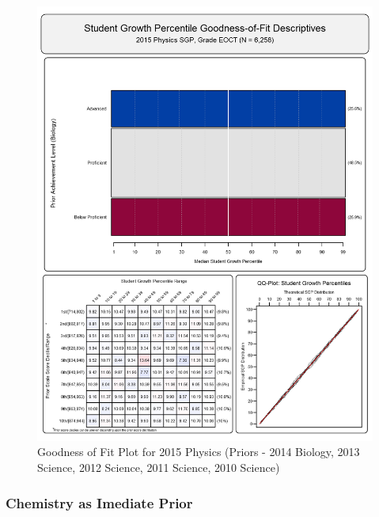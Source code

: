\documentclass[12pt]{article}
\begin{document}
\begin{figure}[htbp]
\centering
\includegraphics{../img/Goodness_of_Fit/PHYSICS.2015/2015_PHYSICS_EOCT;2014_BIOLOGY_EOCT;2013_SCIENCE_EOCT;2012_SCIENCE_EOCT;2011_SCIENCE_EOCT;2010_SCIENCE_EOCT.png}
\caption{Goodness of Fit Plot for 2015 Physics (Priors - 2014 Biology,
2013 Science, 2012 Science, 2011 Science, 2010 Science)}
\end{figure}

\clearpage 

\subsubsection{Chemistry as Imediate
Prior}\label{chemistry-as-imediate-prior}
\end{document}
